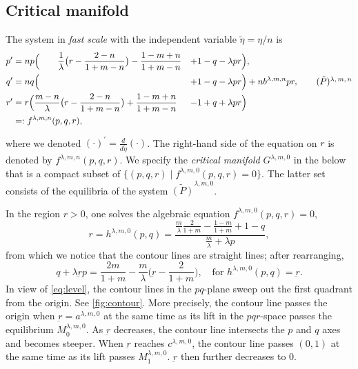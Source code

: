 \documentclass[a4paper,11pt]{article}
\numberwithin{step}{dummy}
\begin{document}
\subsection{Critical manifold} \label{sec:crt_mfd}
The system in {\it fast scale} with the independent variable $\tilde{\eta} = \eta/n$ is
{\small
\begin{align} 
 p^\prime &=np\Big( ~~~~~~\frac{1}{ \lambda }\big(r - \frac{2-n}{1+m-n}\big) - \frac{1-m+n}{1+m-n} &+&1-q- \lambda p r\Big), \nonumber \\
 q^\prime &=nq\Big(                                                                          &+&1-q- \lambda p r\Big) + nb^{\lambda,m,n}pr, \tag*{($\tilde{P}$)\textsuperscript{$\lambda,m,n$}}\label{eq:pqr_fast} \\%
 r^\prime&=r\Big( \frac{m-n}{ \lambda }\big(r - \frac{2-n}{1+m-n}\big) + \frac{1-m+n}{1+m-n} &-&1+q+ \lambda p r\Big)\nonumber \\
 &=:f^{\lambda,m,n}(p,q,r), \nonumber
\end{align}
}

\noindent where we denoted $(\cdot)^\prime = \frac{d}{d\tilde{\eta}}(\cdot)$. 
The right-hand side of the equation on $r$ is denoted by $f^{\lambda,m,n}(p,q,r)$. We specify the {\it critical manifold} $G^{\lambda,m,0}$ in the below that is a compact subset of $\{(p,q,r)\;|\; f^{\lambda,m,0}(p,q,r)=0\}$. The latter set consists of the equilibria of the system $\tilde{(P)}^{\lambda,m,0}$. 

In the region $r>0$, one solves the algebraic equation $f^{\lambda,m,0}(p,q,r)=0$,
\begin{equation}
r=h^{\lambda,m,0}(p,q) = \frac{\frac{m}{ \lambda} \frac{2}{1+m}-\frac{1-m}{1+m} + 1 - q}{\frac{m}{ \lambda} + \lambda p}, \label{eq:hn0}
\end{equation}
from which we notice that the contour lines are straight lines; after rearranging, 
\begin{equation}
 q + \lambda \underbar{r}p = \frac{2m}{1+m}-\frac{m}{ \lambda } \big( \underbar{r} - \frac{2}{1+m} \big), \quad \text{for  $h^{\lambda,m,0}(p,q)=\underbar{r}$.} \label{eq:level}
\end{equation}
In view of \eqref{eq:level}, the contour lines in the $pq$-plane sweep out the first quadrant from the origin. See \eqref{fig:contour}. More precisely, the contour line passes the origin when $\underbar{r}=a^{ \lambda,m,0}$ at the same time as its lift in the $pqr$-space passes the equilibrium $M_0^{ \lambda,m,0}$. As $\underbar{r}$ decreases, the contour line intersects the $p$ and $q$ axes and becomes steeper. When $\underbar{r}$ reaches $c^{ \lambda,m,0}$, the contour line passes $(0,1)$ at the same time as its lift passes $M_1^{ \lambda,m,0}$. $\underbar{r}$ then further decreases to $0$. 
\end{document}
